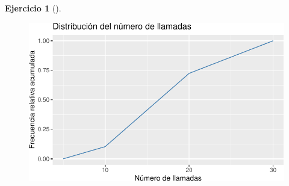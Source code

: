 \documentclass[
  a4paper,
]{scrreport}
\theoremstyle{definition}
\newtheorem{exercise}{Ejercicio}[chapter]
\theoremstyle{remark}
\begin{document}
\begin{exercise}[]
\begin{tcolorbox}
\begin{figure}[H]

{\centering \includegraphics{./03-frecuencias-graficos_files/figure-pdf/unnamed-chunk-21-1.pdf}

}

\end{figure}

\end{tcolorbox}

\end{exercise}
\end{document}
